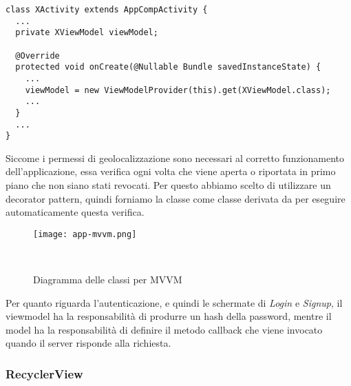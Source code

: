 \documentclass[../../manuale-manutentore.tex]{subfiles}
\begin{document}
\begin{verbatim}
class XActivity extends AppCompActivity {
  ...
  private XViewModel viewModel;

  @Override
  protected void onCreate(@Nullable Bundle savedInstanceState) {
    ...
    viewModel = new ViewModelProvider(this).get(XViewModel.class);
    ...
  }
  ...
}
\end{verbatim}

Siccome i permessi di geolocalizzazione sono necessari al corretto funzionamento dell'applicazione, essa verifica ogni volta che viene aperta o riportata in primo piano che non siano stati revocati.
Per questo abbiamo scelto di utilizzare un decorator pattern, quindi forniamo la classe  come classe derivata da  per eseguire automaticamente questa verifica.

\begin{figure}[h]
  \centering
  \texttt{[image: app-mvvm.png]}
  \caption{Diagramma delle classi per MVVM}
~~\label{fig:app/diagramma_classi_mvvm}
\end{figure}

Per quanto riguarda l'autenticazione, e quindi le schermate di \textit{Login} e \textit{Signup}, il viewmodel ha la responsabilità di produrre un hash della password, mentre il model ha la responsabilità di definire il metodo callback che viene invocato quando il server risponde alla richiesta.

\subsubsection{RecyclerView}%
\label{subs:recyclerview}
\end{document}
